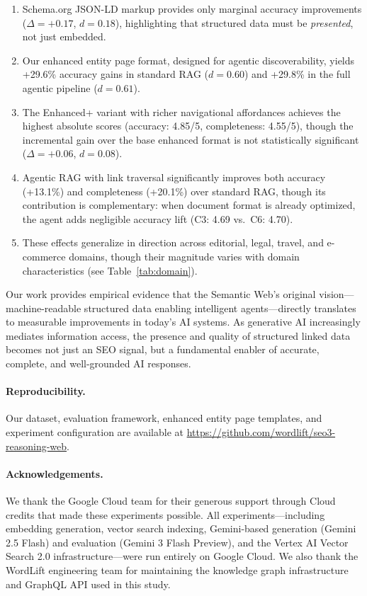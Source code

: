 \documentclass[runningheads]{llncs}
\begin{document}
\begin{enumerate}
    \item Schema.org JSON-LD markup provides only marginal accuracy
          improvements ($\Delta = +0.17$, $d = 0.18$), highlighting
          that structured data must be \emph{presented}, not just embedded.
    \item Our enhanced entity page format, designed for agentic
          discoverability, yields +29.6\% accuracy gains in standard
          RAG ($d = 0.60$) and +29.8\% in the full agentic pipeline
          ($d = 0.61$).
    \item The Enhanced+ variant with richer navigational affordances
          achieves the highest absolute scores (accuracy: 4.85/5,
          completeness: 4.55/5), though the incremental gain over the
          base enhanced format is not statistically significant
          ($\Delta = +0.06$, $d = 0.08$).
    \item Agentic RAG with link traversal significantly improves
          both accuracy (+13.1\%) and completeness (+20.1\%) over
          standard RAG, though its contribution is complementary:
          when document format is already optimized, the agent adds
          negligible accuracy lift (C3: 4.69 vs.\ C6: 4.70).
    \item These effects generalize in direction across editorial,
          legal, travel, and e-commerce domains, though their
          magnitude varies with domain characteristics
          (see Table~\ref{tab:domain}).
\end{enumerate}

Our work provides empirical evidence that the Semantic Web's original
vision---machine-readable structured data enabling intelligent
agents---directly translates to measurable improvements in today's
AI systems. As generative AI increasingly mediates information access,
the presence and quality of structured linked data becomes not just
an SEO signal, but a fundamental enabler of accurate, complete,
and well-grounded AI responses.

\paragraph{Reproducibility.} Our dataset, evaluation framework,
enhanced entity page templates, and experiment configuration are
available at \url{https://github.com/wordlift/seo3-reasoning-web}.

\paragraph{Acknowledgements.}
We thank the Google Cloud team for their generous support through Cloud
credits that made these experiments possible.  All experiments---including
embedding generation, vector search indexing, Gemini-based generation
(Gemini 2.5 Flash) and evaluation (Gemini 3 Flash Preview), and the
Vertex AI Vector Search 2.0 infrastructure---were run entirely on Google
Cloud.  We also thank the WordLift engineering team for maintaining the
knowledge graph infrastructure and GraphQL API used in this study.
\end{document}
